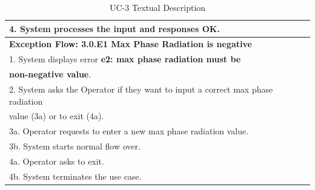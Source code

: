 \begin{table}[h]
\begin{center}
\begin{tabular}{|l|l|}
\\ 4. System processes the input and responses OK.\\ \hline
\textbf{Exception Flow: 3.0.E1 Max Phase Radiation is negative}
\\ 1. System displays error \textbf{e2: max phase radiation must be} \\ \textbf{non-negative value}.
\\ 2. System asks the Operator if they want to input a correct max phase radiation \\value (3a) or to exit (4a).
\\ 3a. Operator requests to enter a new max phase radiation value.
\\ 3b. System starts normal flow over.
\\ 4a. Operator asks to exit.
\\ 4b. System terminates the use case.\\ \hline
\end{tabular}
\end{center}
\caption {UC-3 Textual Description}
\label{tbl:uc3td}
\end{table}

